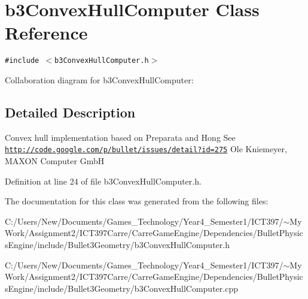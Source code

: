 \hypertarget{classb3_convex_hull_computer}{
\section{b3ConvexHullComputer Class Reference}
\label{classb3_convex_hull_computer}
}
{\tt \#include $<$b3ConvexHullComputer.h$>$}

Collaboration diagram for b3ConvexHullComputer:

\subsection{Detailed Description}
Convex hull implementation based on Preparata and Hong See \href{http://code.google.com/p/bullet/issues/detail?id=275}{\tt http://code.google.com/p/bullet/issues/detail?id=275} Ole Kniemeyer, MAXON Computer GmbH 

Definition at line 24 of file b3ConvexHullComputer.h.

The documentation for this class was generated from the following files:\begin{CompactItemize}
\item 
C:/Users/New/Documents/Games\_\-Technology/Year4\_\-Semester1/ICT397/$\sim$My Work/Assignment2/ICT397Carre/CarreGameEngine/Dependencies/BulletPhysicsEngine/include/Bullet3Geometry/b3ConvexHullComputer.h\item 
C:/Users/New/Documents/Games\_\-Technology/Year4\_\-Semester1/ICT397/$\sim$My Work/Assignment2/ICT397Carre/CarreGameEngine/Dependencies/BulletPhysicsEngine/include/Bullet3Geometry/b3ConvexHullComputer.cpp\end{CompactItemize}

